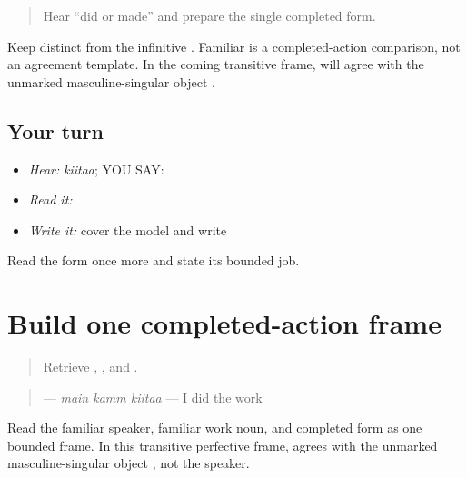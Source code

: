 \label{lesson:PA-C190-kita-review}



\begin{quote}
Hear “did or made” and prepare the single completed form.
\end{quote}

\begin{grammarlens}[title={Grammar Lens}]
Keep \textbf{} distinct from the infinitive \textbf{}. Familiar \textbf{} is a completed-action comparison, not an agreement template. In the coming transitive frame, \textbf{} will agree with the unmarked masculine-singular object \textbf{}.
\end{grammarlens}

\subsection*{Your turn}
\begin{itemize}
\raggedright
  \item \emph{Hear:} \emph{kiitaa}; YOU SAY: \textbf{}
  \item \emph{Read it:} \textbf{}
  \item \emph{Write it:} cover the model and write \textbf{}
\end{itemize}

\begin{tcolorbox}[breakable,colback=teal!4,colframe=teal!35!black,title={Before you move on}]
Read the form once more and state its bounded job.
\end{tcolorbox}
\section[\texorpdfstring{\pa{ਮੈਂ} \pa{ਕੰਮ} \pa{ਕੀਤਾ} (main kamm kiitaa)}{ਮੈਂ ਕੰਮ ਕੀਤਾ (main kamm kiitaa)}]{Build one completed-action frame}

\label{lesson:PA-C190-kamm-kita}



\begin{quote}
Retrieve \textbf{}, \textbf{}, and \textbf{}.
\end{quote}

\begin{grammarlens}[title={Grammar Lens: complete statement}]
\begin{quote}
\textbf{  } — \emph{main kamm kiitaa} — I did the work
\end{quote}

Read the familiar speaker, familiar work noun, and completed form as one bounded frame. In this transitive perfective frame, \textbf{} agrees with the unmarked masculine-singular object \textbf{}, not the speaker.
\end{grammarlens}

